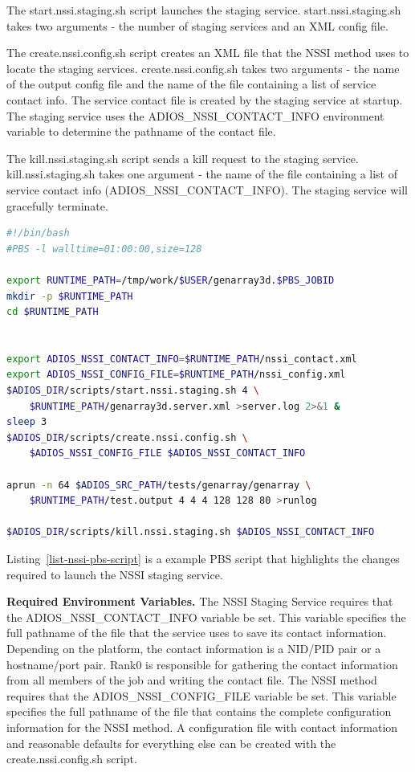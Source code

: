 The start.nssi.staging.sh script launches the staging service.  start.nssi.staging.sh 
takes two arguments - the number of staging services and an XML config file.

The create.nssi.config.sh script creates an XML file that the NSSI method uses 
to locate the staging services.  create.nssi.config.sh takes two arguments - the 
name of the output config file and the name of the file containing a list of service 
contact info.  The service contact file is created by the staging service at startup. 
 The staging service uses the ADIOS\_NSSI\_CONTACT\_INFO environment variable to 
determine the pathname of the contact file.

The kill.nssi.staging.sh script sends a kill request to the staging service.  kill.nssi.staging.sh 
 takes one argument - the name of the file containing a list of service contact 
info (ADIOS\_NSSI\_CONTACT\_INFO).  The staging service will gracefully terminate.

\begin{lstlisting}[language=bash, caption={Example PBS script with NSSI Staging Service}, label=list-nssi-pbs-script]
#!/bin/bash
#PBS -l walltime=01:00:00,size=128

export RUNTIME_PATH=/tmp/work/$USER/genarray3d.$PBS_JOBID
mkdir -p $RUNTIME_PATH
cd $RUNTIME_PATH


export ADIOS_NSSI_CONTACT_INFO=$RUNTIME_PATH/nssi_contact.xml
export ADIOS_NSSI_CONFIG_FILE=$RUNTIME_PATH/nssi_config.xml 
$ADIOS_DIR/scripts/start.nssi.staging.sh 4 \
	$RUNTIME_PATH/genarray3d.server.xml >server.log 2>&1 &
sleep 3
$ADIOS_DIR/scripts/create.nssi.config.sh \
	$ADIOS_NSSI_CONFIG_FILE $ADIOS_NSSI_CONTACT_INFO 

aprun -n 64 $ADIOS_SRC_PATH/tests/genarray/genarray \
	$RUNTIME_PATH/test.output 4 4 4 128 128 80 >runlog 

$ADIOS_DIR/scripts/kill.nssi.staging.sh $ADIOS_NSSI_CONTACT_INFO
\end{lstlisting}

Listing~\ref{list-nssi-pbs-script} is a example PBS script that highlights the changes required to launch 
the NSSI staging service.

\textbf{Required Environment Variables.}  The NSSI Staging Service requires that 
the ADIOS\_NSSI\_CONTACT\_INFO variable be set.  This variable specifies the full 
pathname of the file that the service uses to save its contact information.  Depending 
on the platform, the contact information is a NID/PID pair or a hostname/port pair. 
 Rank0 is responsible for gathering the contact information from all members of 
the job and writing the contact file.  The NSSI method requires that the ADIOS\_NSSI\_CONFIG\_FILE 
variable be set.  This variable specifies the full pathname of the file that contains 
the complete configuration information for the NSSI method.  A configuration file 
with contact information and reasonable defaults for everything else can be created 
with the create.nssi.config.sh script.

